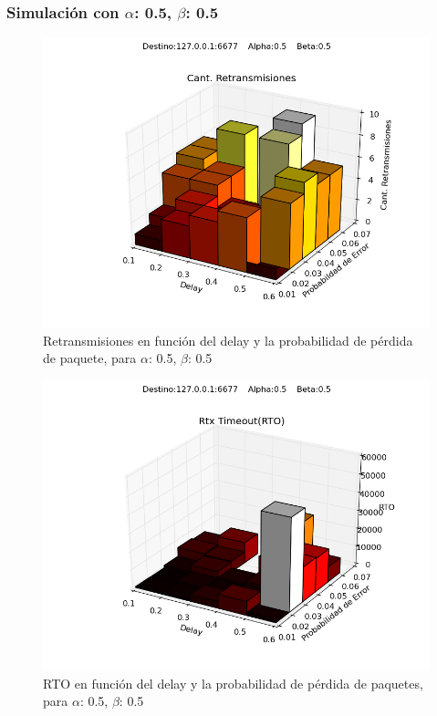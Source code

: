 \subsubsection{Simulación con $\alpha$: 0.5, $\beta$: 0.5}
\begin{figure}[H]
  \centering	
	\includegraphics[scale=0.5]{../analisis/graficos_tablas/graficos_en_funcion_de_delay_probaerror/0.5-0.5/retransmisiones.png}
  \caption{Retransmisiones en funci\'on del delay y la probabilidad de pérdida de paquete, para $\alpha$: 0.5, $\beta$: 0.5}
	\label{fig:histo-src-sitiotrabajo}
\end{figure}

\begin{figure}[H]
  \centering	
	\includegraphics[scale=0.5]{../analisis/graficos_tablas/graficos_en_funcion_de_delay_probaerror/0.5-0.5/rto.png}
  \caption{RTO en función del delay y la probabilidad de pérdida de paquetes, para $\alpha$: 0.5, $\beta$: 0.5}
	\label{fig:histo-src-sitiotrabajo}
\end{figure}

